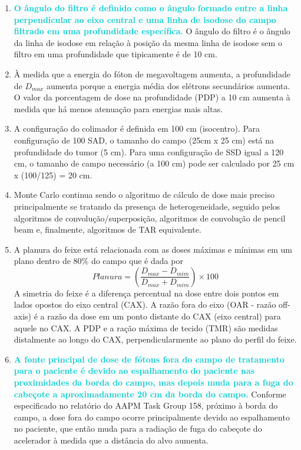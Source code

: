 \documentclass[11pt,a4paper]{article}
\begin{document}
\begin{enumerate}
        \item \textcolor{DarkTurquoise}{\textbf{O ângulo do filtro é definido como o ângulo formado entre a linha perpendicular ao eixo central e uma linha de isodose do campo filtrado em uma profundidade específica.}} O ângulo do filtro é o ângulo da linha de isodose em relação à posição da mesma linha de isodose sem o filtro em uma profundidade que tipicamente é de 10 cm.

        \item À medida que a energia do fóton de megavoltagem aumenta, a profundidade de $D_{max}$ aumenta porque a energia média dos elétrons secundários aumenta. O valor da porcentagem de dose na profundidade (PDP) a 10 cm aumenta à medida que há menos atenuação para energias mais altas.

        \item A configuração do colimador é definida em 100 cm (isocentro). Para configuração de 100 SAD, o tamanho do campo (25cm x 25 cm) está na profundidade do tumor (5 cm). Para uma configuração de SSD igual a 120 cm, o tamanho de campo necessário (a 100 cm) pode ser calculado por 25 cm x (100/125) = 20 cm.

        \item Monte Carlo continua sendo o algoritmo de cálculo de dose mais preciso principalmente se tratando da presença de heterogeneidade, seguido pelos algoritmos de convolução/superposição, algoritmos de convolução de pencil beam e, finalmente, algoritmos de TAR equivalente.

        \item A planura do feixe está relacionada com as doses máximas e mínimas em um plano dentro de 80\% do campo que é dada por $$Planura = \left(\frac{D_{max} - D_{mim}}{D_{max} + D_{mim}}\right)\times 100$$ A simetria do feixe é a diferença percentual na dose entre dois pontos em lados opostos do eixo central (CAX). A razão fora do eixo (OAR - razão off-axis) é a razão da dose em um ponto distante do CAX (eixo central) para aquele no CAX. A PDP e a ração máxima de tecido (TMR) são medidas distalmente ao longo do CAX, perpendicularmente ao plano do perfil do feixe.

        \item \textcolor{DarkTurquoise}{\textbf{A fonte principal de dose de fótons fora do campo de tratamento para o paciente é devido ao espalhamento do paciente nas proximidades da borda do campo, mas depois muda para a fuga do cabeçote a aproximadamente 20 cm da borda do campo.}} Conforme especificado no relatório do AAPM Task Group 158, próximo à borda do campo, a dose fora do campo ocorre principalmente devido ao espalhamento no paciente, que então muda para a radiação de fuga do cabeçote do acelerador à medida que a distância do alvo aumenta. 


\end{enumerate}
\end{document}
